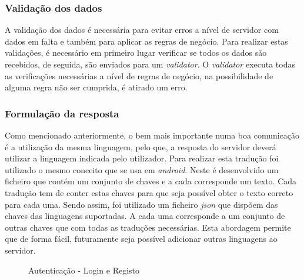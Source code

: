 \subsubsection{Validação dos dados}
A validação dos dados é necessária para evitar erros a nível de servidor com dados em falta e também para aplicar as regras de negócio. Para realizar estas validações, é necessário em primeiro lugar verificar se todos os dados são recebidos, de seguida, são enviados para um \textit{validator}. O \textit{validator} executa todas as verificações necessárias a nível de regras de negócio, na possibilidade de alguma regra não ser cumprida, é atirado um erro.

\subsubsection{Formulação da resposta}
Como mencionado anteriormente, o bem mais importante numa boa comunicação é a utilização da mesma linguagem, pelo que, a resposta do servidor deverá utilizar a linguagem indicada pelo utilizador. Para realizar esta tradução foi utilizado o mesmo conceito que se usa em \textit{android}. Neste é desenvolvido um ficheiro que contém um conjunto de chaves e a cada corresponde um texto. Cada tradução tem de conter estas chaves para que seja possível obter o texto correto para cada uma. Sendo assim, foi utilizado um ficheiro \textit{json} que dispõem das chaves das linguagens suportadas. A cada uma corresponde a um conjunto de outras chaves que com todas as traduções necessárias. Esta abordagem permite que de forma fácil, futuramente seja possível adicionar outras linguagens ao servidor.

\begin{figure}[htb]%
  \centering
  \qquad
  \caption{Autenticação - Login e Registo}%
  \label{fig:24}
\end{figure}

